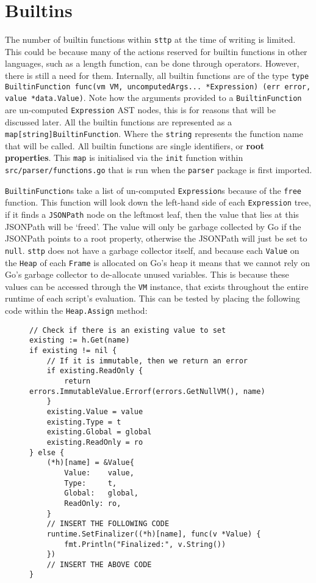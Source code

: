 \section{Builtins}
\label{sec:development-builtins}

The number of builtin functions within \verb|sttp| at the time of writing is limited. This could be because many of the actions reserved for builtin functions in other languages, such as a length function, can be done through operators. However, there is still a need for them. Internally, all builtin functions are of the type \texttt{type BuiltinFunction func(vm VM, uncomputedArgs... *Expression) (err error, value *data.Value)}. Note how the arguments provided to a \verb|BuiltinFunction| are un-computed \verb|Expression| AST nodes, this is for reasons that will be discussed later. All the builtin functions are represented as a \texttt{map[string]BuiltinFunction}. Where the \texttt{string} represents the function name that will be called. All builtin functions are single identifiers, or \textbf{root properties}. This \texttt{map} is initialised via the \verb|init| function within \verb|src/parser/functions.go| that is run when the \verb|parser| package is first imported.

\verb|BuiltinFunction|s take a list of un-computed \verb|Expression|s because of the \verb|free| function. This function will look down the left-hand side of each \verb|Expression| tree, if it finds a \verb|JSONPath| node on the leftmost leaf, then the value that lies at this JSONPath will be `freed'. The value will only be garbage collected by Go if the JSONPath points to a root property, otherwise the JSONPath will just be set to \verb|null|. \verb|sttp| does not have a garbage collector itself, and because each \verb|Value| on the \verb|Heap| of each \verb|Frame| is allocated on Go's heap it means that we cannot rely on Go's garbage collector to de-allocate unused variables. This is because these values can be accessed through the \verb|VM| instance, that exists throughout the entire runtime of each script's evaluation. This can be tested by placing the following code within the \verb|Heap.Assign| method:

\begin{figure}[H]
    \begin{verbatim}
// Check if there is an existing value to set
existing := h.Get(name)
if existing != nil {
    // If it is immutable, then we return an error
    if existing.ReadOnly {
        return errors.ImmutableValue.Errorf(errors.GetNullVM(), name)
    }
    existing.Value = value
    existing.Type = t
    existing.Global = global
    existing.ReadOnly = ro
} else {
    (*h)[name] = &Value{
        Value:    value,
        Type:     t,
        Global:   global,
        ReadOnly: ro,
    }
    // INSERT THE FOLLOWING CODE
    runtime.SetFinalizer((*h)[name], func(v *Value) {
        fmt.Println("Finalized:", v.String())
    })
    // INSERT THE ABOVE CODE
}
    \end{verbatim}
\end{figure}

